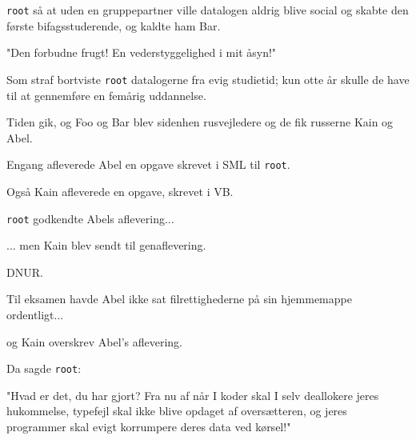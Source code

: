 \documentclass[a4paper,11pt]{article}
\begin{document}
\begin{sketch}
   \texttt{root} så at uden en gruppepartner ville datalogen aldrig
  blive social og skabte den første bifagsstuderende, og kaldte ham Bar.


   "Den forbudne frugt!  En vederstyggelighed i mit åsyn!"


   Som straf bortviste \texttt{root} datalogerne fra evig studietid;
  kun otte år skulle de have til at gennemføre en femårig uddannelse.

  Tiden gik, og Foo og Bar blev sidenhen rusvejledere og de
  fik russerne Kain og Abel.


   Engang afleverede Abel en opgave skrevet i SML til
  \texttt{root}.


   Også Kain afleverede en opgave, skrevet i VB.


   \texttt{root} godkendte Abels aflevering...


  ... men Kain blev sendt til genaflevering.


   DNUR.

   Til eksamen havde Abel ikke sat filrettighederne på sin
  hjemmemappe ordentligt...


   og Kain overskrev Abel's aflevering.


   Da sagde \texttt{root}:

   "Hvad er det, du har gjort?  Fra nu af når I koder
  skal I selv deallokere jeres hukommelse, typefejl skal ikke blive
  opdaget af oversætteren, og jeres programmer skal evigt korrumpere
  deres data ved kørsel!"


\end{sketch}
\end{document}
